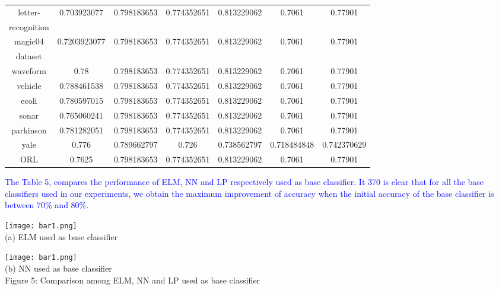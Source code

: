 \documentclass{article}
\begin{document}
\begin{center}
{\begin{tabular}{|c|c|c|c|c|c|c|}
				\hline
				letter- & 0.703923077 & 0.798183653 & 0.774352651 & 0.813229062 & 0.7061 & 0.77901 \\
				recognition &  &  &  &  &  &  \\
				\hline
				magic04 & 0.7203923077 & 0.798183653 & 0.774352651 & 0.813229062 & 0.7061 & 0.77901 \\
				dataset &  &  &  &  &  &  \\
				\hline
				waveform & 0.78 & 0.798183653 & 0.774352651 & 0.813229062 & 0.7061 & 0.77901 \\
				\hline
				vehicle & 0.788461538 & 0.798183653 & 0.774352651 & 0.813229062 & 0.7061 & 0.77901 \\
				\hline
				ecoli & 0.780597015 & 0.798183653 & 0.774352651 & 0.813229062 & 0.7061 & 0.77901 \\
				\hline
				sonar & 0.765060241 & 0.798183653 & 0.774352651 & 0.813229062 & 0.7061 & 0.77901 \\
				\hline
				parkinson & 0.781282051 & 0.798183653 & 0.774352651 & 0.813229062 & 0.7061 & 0.77901 \\
				\hline
				yale & 0.776 & 0.789662797 & 0.726 & 0.738562797 & 0.718484848 & 0.742370629\\
				\hline
				ORL & 0.7625 & 0.798183653 & 0.774352651 & 0.813229062 & 0.7061 & 0.77901 \\
				\hline
			\end{tabular}
		}
	\end{center}
	
	\vspace{0.7cm}
	
	
	\textcolor{blue}{The Table 5, compares the performance of ELM, NN and LP respectively used as base classifier. It
		370 is clear that for all the base classifiers used in our experiments, we obtain the maximum improvement of
		accuracy when the initial accuracy of the base classifier is between 70\% and 80\%.}

	
		
		
		\newpage
		\begin{center}
			\texttt{[image: bar1.png]} \\
			\small (a) ELM used as base classifier\\
		\end{center}
		
		\begin{center}
			\texttt{[image: bar1.png]} \\
			\small (b) NN used as base classifier\\
			Figure 5: Comparison among ELM, NN and LP used as base classifier
		\end{center}
		
\end{document}

